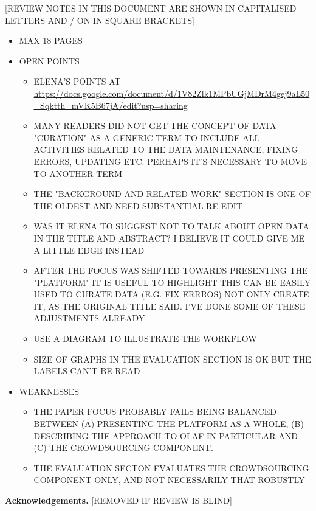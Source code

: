 \documentclass{llncs}
\begin{document}
[REVIEW NOTES IN THIS DOCUMENT ARE SHOWN IN CAPITALISED LETTERS AND / ON IN SQUARE BRACKETS] 
\begin{itemize}

    \item MAX 18 PAGES
    \item OPEN POINTS
        \begin{itemize}
            \item ELENA'S POINTS AT \url{https://docs.google.com/document/d/1V82Zlk1MPbUGjMDrM4gej9aL50_Sqktth_mVK5B67jA/edit?usp=sharing}
            \item MANY READERS DID NOT GET THE CONCEPT OF DATA "CURATION" AS A GENERIC TERM TO INCLUDE ALL ACTIVITIES RELATED TO THE DATA MAINTENANCE, FIXING ERRORS, UPDATING ETC.  PERHAPS IT'S NECESSARY TO MOVE TO ANOTHER TERM
            \item THE "BACKGROUND AND RELATED WORK" SECTION IS ONE OF THE OLDEST AND NEED SUBSTANTIAL RE-EDIT
            \item WAS IT ELENA TO SUGGEST NOT TO TALK ABOUT OPEN DATA IN THE TITLE AND ABSTRACT? I BELIEVE IT COULD GIVE ME A LITTLE EDGE INSTEAD
            \item AFTER THE FOCUS WAS SHIFTED TOWARDS PRESENTING THE "PLATFORM" IT IS USEFUL TO HIGHLIGHT THIS CAN BE EASILY USED TO CURATE DATA (E.G. FIX ERRROS) NOT ONLY CREATE IT, AS THE ORIGINAL TITLE SAID. I'VE DONE SOME OF THESE ADJUSTMENTS ALREADY
            \item USE A DIAGRAM TO ILLUSTRATE THE WORKFLOW
            \item SIZE OF GRAPHS IN THE EVALUATION SECTION IS OK BUT THE LABELS CAN'T BE READ
        \end{itemize}
    \item WEAKNESSES 
        \begin{itemize}
            \item THE PAPER FOCUS PROBABLY FAILS BEING BALANCED BETWEEN (A) PRESENTING THE PLATFORM AS A WHOLE, (B) DESCRIBING THE APPROACH TO OLAF IN PARTICULAR AND (C) THE CROWDSOURCING COMPONENT.  
            \item THE EVALUATION SECTON EVALUATES THE CROWDSOURCING COMPONENT ONLY, AND NOT NECESSARILY THAT ROBUSTLY
        \end{itemize}
\end{itemize}









\textbf{Acknowledgements.} [REMOVED IF REVIEW IS BLIND]


\end{document}
